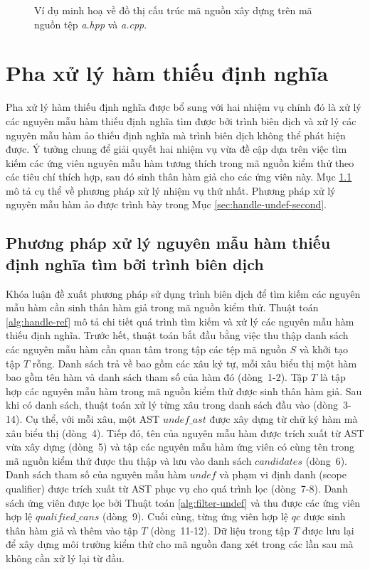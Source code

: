 \begin{figure}[t]
    \centering
    
    \caption{Ví dụ minh hoạ về đồ thị cấu trúc mã nguồn xây dựng trên mã nguồn tệp \textit{a.hpp} và \textit{a.cpp}.}
    \label{fig:dep-graph}
\end{figure}

\section{Pha xử lý hàm thiếu định nghĩa} \label{sec:handle-undef}
Pha xử lý hàm thiếu định nghĩa được bổ sung với hai nhiệm vụ chính đó là xử lý các nguyên mẫu hàm thiếu định nghĩa tìm được bởi trình biên dịch và xử lý các nguyên mẫu hàm ảo thiếu định nghĩa mà trình biên dịch không thể phát hiện được. Ý tưởng chung để giải quyết hai nhiệm vụ vừa đề cập dựa trên việc tìm kiếm các ứng viên nguyên mẫu hàm tương thích trong mã nguồn kiểm thử theo các tiêu chí thích hợp, sau đó sinh thân hàm giả cho các ứng viên này. Mục \ref{sec:handle-undef-first} mô tả cụ thể về phương pháp xử lý nhiệm vụ thứ nhất. Phương pháp xử lý nguyên mẫu hàm ảo được trình bày trong Mục \ref{sec:handle-undef-second}.

\subsection{ Phương pháp xử lý nguyên mẫu hàm thiếu định nghĩa tìm bởi trình biên dịch} \label{sec:handle-undef-first}
Khóa luận đề xuất phương pháp sử dụng trình biên dịch để tìm kiếm các nguyên mẫu hàm cần sinh thân hàm giả trong mã nguồn kiểm thử. Thuật toán \ref{alg:handle-ref} mô tả chi tiết quá trình tìm kiếm và xử lý các nguyên mẫu hàm thiếu định nghĩa. Trước hết, thuật toán bắt đầu bằng việc thu thập danh sách các nguyên mẫu hàm cần quan tâm trong tập các tệp mã nguồn $S$ và khởi tạo tập $T$ rỗng. Danh sách trả về bao gồm các xâu ký tự, mỗi xâu biểu thị một hàm bao gồm tên hàm và danh sách tham số của hàm đó (dòng~1-2). Tập $T$ là tập hợp các nguyên mẫu hàm trong mã nguồn kiểm thử được sinh thân hàm giả. Sau khi có danh sách, thuật toán xử lý từng xâu trong danh sách đầu vào (dòng~3-14). Cụ thể, với mỗi xâu, một AST $undef\_ast$ được xây dựng từ chữ ký hàm mà xâu biểu thị (dòng~4). Tiếp đó, tên của nguyên mẫu hàm được trích xuất từ AST vừa xây dựng (dòng~5) và tập các nguyên mẫu hàm ứng viên có cùng tên trong mã nguồn kiểm thử được thu thập và lưu vào danh sách $candidates$ (dòng~6). Danh sách tham số của nguyên mẫu hàm $undef$ và phạm vi định danh (scope qualifier) được trích xuất từ AST phục vụ cho quá trình lọc (dòng~7-8). Danh sách ứng viên được lọc bởi Thuật toán \ref{alg:filter-undef} và thu được các ứng viên hợp lệ $qualified\_cans$ (dòng~9). Cuối cùng, từng ứng viên hợp lệ $qc$ được sinh thân hàm giả và thêm vào tập $T$ (dòng~11-12). Dữ liệu trong tập $T$ được lưu lại để xây dựng môi trường kiểm thử cho mã nguồn đang xét trong các lần sau mà không cần xử lý lại từ đầu.

